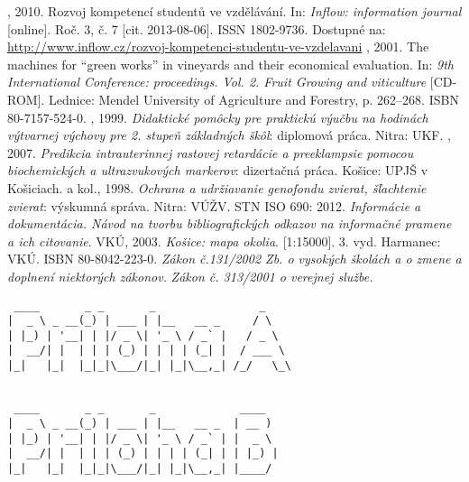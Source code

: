 \documentclass[thesismargins, thesislinespacing, twoside, upjsfrontpage]{rnthesis}
\begin{document}
\begin{thebibliography}{9}
	, 2010. Rozvoj kompetencí studentů ve vzdělávání. In: \emph{Inflow: information journal} [online]. Roč. 3, č. 7 [cit. 2013-08-06]. ISSN 1802-9736. Dostupné na: \url{http://www.inflow.cz/rozvoj-kompetenci-studentu-ve-vzdelavani}
	, 2001. The machines for ``green works'' in vineyards and their economical evaluation. In: \emph{9th International Conference: proceedings. Vol. 2. Fruit Growing and viticulture} [CD-ROM]. Lednice: Mendel University of Agriculture and Forestry, p. 262--268. ISBN 80-7157-524-0.
	, 1999. \emph{Didaktické pomôcky pre praktickú výučbu na hodinách výtvarnej výchovy pre 2. stupeň základných škôl}: diplomová práca. Nitra: UKF.
	, 2007. \emph{Predikcia intrauterinnej rastovej retardácie a preeklampsie pomocou biochemických a ultrazvukových markerov}: dizertačná práca. Košice: UPJŠ v Košiciach.
	 a kol., 1998. \emph{Ochrana a udržiavanie genofondu zvierat, šľachtenie zvierat}: výskumná správa. Nitra: VÚŽV.
	STN ISO 690: 2012. \emph{Informácie a dokumentácia. Návod na tvorbu bibliografických odkazov na informačné pramene a ich citovanie}.
	VKÚ, 2003. \emph{Košice: mapa okolia}. [1:15000]. 3. vyd. Harmanec: VKÚ. ISBN 80-8042-223-0.
	\emph{Zákon č.131/2002 Zb. o vysokých školách a o zmene a doplnení niektorých zákonov.}
	\emph{Zákon č. 313/2001 o verejnej službe.}

\end{thebibliography}
%
%
\prilohy
{}
\begin{verbatim}
 ____       _ _       _                _    
|  _ \ _ __(_) | ___ | |__   __ _     / \   
| |_) | '__| | |/ _ \| '_ \ / _` |   / _ \  
|  __/| |  | | | (_) | | | | (_| |  / ___ \ 
|_|   |_|  |_|_|\___/|_| |_|\__,_| /_/   \_\
                                             
\end{verbatim}

\begin{verbatim}
 ____       _ _       _             ____  
|  _ \ _ __(_) | ___ | |__   __ _  | __ ) 
| |_) | '__| | |/ _ \| '_ \ / _` | |  _ \ 
|  __/| |  | | | (_) | | | | (_| | | |_) |
|_|   |_|  |_|_|\___/|_| |_|\__,_| |____/ 

\end{verbatim}
\end{document}
